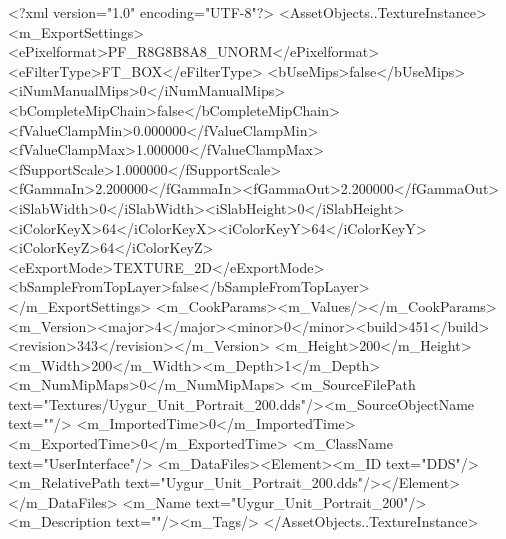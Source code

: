 <?xml version="1.0" encoding="UTF-8"?>
<AssetObjects..TextureInstance>
  <m_ExportSettings>
    <ePixelformat>PF_R8G8B8A8_UNORM</ePixelformat><eFilterType>FT_BOX</eFilterType>
    <bUseMips>false</bUseMips><iNumManualMips>0</iNumManualMips><bCompleteMipChain>false</bCompleteMipChain>
    <fValueClampMin>0.000000</fValueClampMin><fValueClampMax>1.000000</fValueClampMax><fSupportScale>1.000000</fSupportScale>
    <fGammaIn>2.200000</fGammaIn><fGammaOut>2.200000</fGammaOut><iSlabWidth>0</iSlabWidth><iSlabHeight>0</iSlabHeight>
    <iColorKeyX>64</iColorKeyX><iColorKeyY>64</iColorKeyY><iColorKeyZ>64</iColorKeyZ>
    <eExportMode>TEXTURE_2D</eExportMode><bSampleFromTopLayer>false</bSampleFromTopLayer>
  </m_ExportSettings>
  <m_CookParams><m_Values/></m_CookParams>
  <m_Version><major>4</major><minor>0</minor><build>451</build><revision>343</revision></m_Version>
  <m_Height>200</m_Height><m_Width>200</m_Width><m_Depth>1</m_Depth><m_NumMipMaps>0</m_NumMipMaps>
  <m_SourceFilePath text="Textures/Uygur_Unit_Portrait_200.dds"/><m_SourceObjectName text=""/>
  <m_ImportedTime>0</m_ImportedTime><m_ExportedTime>0</m_ExportedTime>
  <m_ClassName text="UserInterface"/>
  <m_DataFiles><Element><m_ID text="DDS"/><m_RelativePath text="Uygur_Unit_Portrait_200.dds"/></Element></m_DataFiles>
  <m_Name text="Uygur_Unit_Portrait_200"/><m_Description text=""/><m_Tags/>
</AssetObjects..TextureInstance>
